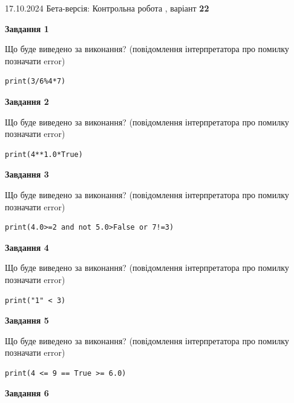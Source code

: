 \documentclass[12pt, ukrainian]{article}
\begin{document}
{\Large{17.10.2024 Бета-версія: Контрольна робота , варіант  \No \textbf { 22 }\par}}
{
\begin {large}
{\begin {center}\textbf{Завдання 1}\end {center}}

Що буде виведено за виконання? (повідомлення інтерпретатора про помилку позначати error)\par
\begin{verbatim}
print(3/6%4*7)
\end{verbatim}

{\begin {center}\textbf{Завдання 2}\end {center}}

Що буде виведено за виконання? (повідомлення інтерпретатора про помилку позначати error)\par
\begin{verbatim}
print(4**1.0*True)
\end{verbatim}

{\begin {center}\textbf{Завдання 3}\end {center}}

Що буде виведено за виконання? (повідомлення інтерпретатора про помилку позначати error)\par
\begin{verbatim}
print(4.0>=2 and not 5.0>False or 7!=3)
\end{verbatim}

{\begin {center}\textbf{Завдання 4}\end {center}}

Що буде виведено за виконання? (повідомлення інтерпретатора про помилку позначати error)\par
\begin{verbatim}
print("1" < 3)
\end{verbatim}

{\begin {center}\textbf{Завдання 5}\end {center}}

Що буде виведено за виконання? (повідомлення інтерпретатора про помилку позначати error)\par
\begin{verbatim}
print(4 <= 9 == True >= 6.0)
\end{verbatim}

{\begin {center}\textbf{Завдання 6}\end {center}}


\end{large}}
\end{document}
